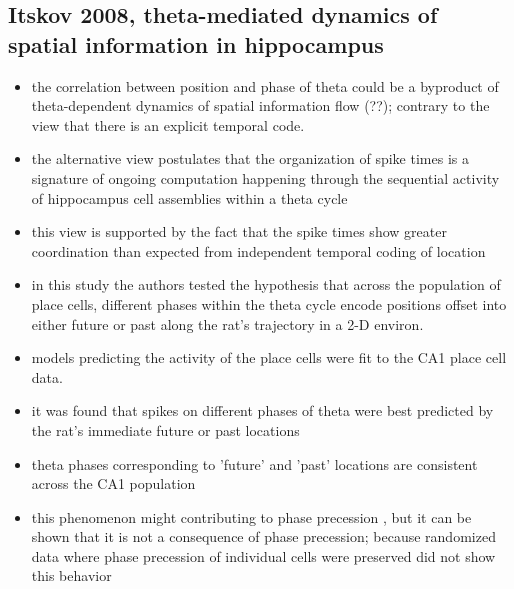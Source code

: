 \subsection{Itskov 2008, theta-mediated dynamics of spatial information in hippocampus}
\begin{itemize}
\item the correlation between position and phase of theta could be a byproduct of theta-dependent dynamics of spatial information flow (??); contrary to the view that there is an explicit temporal code.
\item the alternative view postulates that the organization of spike times is a signature of ongoing computation happening through the sequential activity of hippocampus cell assemblies within a theta cycle
\item this view is supported by the fact that the spike times show greater coordination than expected from independent temporal coding of location
\item in this study the authors tested the hypothesis that across the population of place cells, different phases within the theta cycle encode positions offset into either future or past along the rat's trajectory in a 2-D environ.
\item models predicting the activity of the place cells were fit to the CA1 place cell data. 
\item it was found that spikes on different phases of theta were best predicted by the rat's immediate future or past locations
\item theta phases corresponding to 'future' and 'past' locations are consistent across the CA1 population
\item this phenomenon might contributing to phase precession , but it can be shown that it is not a consequence of phase precession; because randomized data where phase precession of individual cells were preserved did not show this behavior

\end{itemize}

